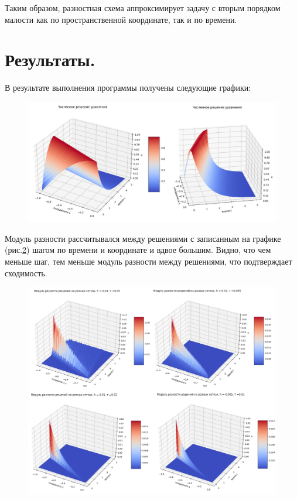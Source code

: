 \documentclass[a4paper,14pt]{article}
\begin{document}
Таким образом, разностная схема аппроксимирует задачу с вторым порядком малости как по пространственной координате, так и по времени.

\section{Результаты.}
В результате выполнения программы получены следующие графики:

\begin{figure}[h!]
\centering
\includegraphics[scale=0.3]{решение.jpg}
\caption{\label{pic4}}
\end{figure}

Модуль разности рассчитывался между решениями с записанным на графике (рис.\ref{pic5}) шагом по времени и координате и вдвое большим. Видно, что чем меньше шаг, тем меньше модуль разности между решениями, что подтверждает сходимость.

\begin{figure}[h!]
\centering
\includegraphics[scale=0.25]{погрешность.jpg}
\caption{\label{pic5}}
\end{figure}
\end{document}
